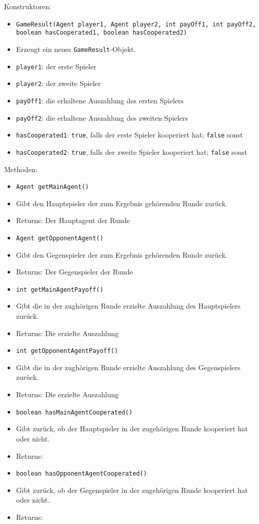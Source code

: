 \documentclass[parskip=full,11pt]{scrartcl}
\begin{document}
Konstruktoren:
\begin{itemize}\itemsep -10pt
\item \texttt{GameResult(Agent player1, Agent player2, int payOff1, int payOff2, boolean hasCooperated1, boolean hasCooperated2)}
\item[] Erzeugt ein neues \texttt{GameResult}-Objekt.
\item[] \texttt{player1}: der erste Spieler
\item[] \texttt{player2}: der zweite Spieler
\item[] \texttt{payOff1}: die erhaltene Auszahlung des ersten Spielers
\item[] \texttt{payOff2}: die erhaltene Auszahlung des zweiten Spielers
\item[] \texttt{hasCooperated1}: \texttt{true}, falls der erste Spieler kooperiert hat; \texttt{false} sonst
\item[] \texttt{hasCooperated2}: \texttt{true}, falls der zweite Spieler kooperiert hat; \texttt{false} sonst
\end{itemize}

Methoden:
\begin{itemize}\itemsep -10pt
	\item \texttt{Agent getMainAgent()}
	\item[]Gibt den Hauptspieler der zum Ergebnis gehörenden Runde zurück.
	\item[]Returns: Der Hauptagent der Runde
	\item \texttt{Agent getOpponentAgent()}
	\item[]Gibt den Gegenspieler der zum Ergebnis gehörenden Runde zurück.
	\item[]Returns: Der Gegenspieler der Runde
	\item \texttt{int getMainAgentPayoff()}
	\item[] Gibt die in der zughörigen Runde erzielte Auszahlung des Hauptspielers zurück.
	\item[]Returns: Die erzielte Auszahlung
	\item \texttt{int getOpponentAgentPayoff()}
	\item[] Gibt die in der zughörigen Runde erzielte Auszahlung des Gegenspielers zurück.
	\item[]Returns: Die erzielte Auszahlung
	\item \texttt{boolean hasMainAgentCooperated()}
	\item[]Gibt zurück, ob der Hauptspieler in der zugehörigen Runde kooperiert hat oder nicht.
	\item[]Returns: 
	\item \texttt{boolean hasOpponentAgentCooperated()}
	\item[]Gibt zurück, ob der Gegenspieler in der zugehörigen Runde kooperiert hat oder nicht.
	\item[]Returns: 
\end{itemize}
\end{document}

